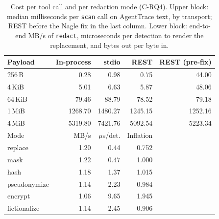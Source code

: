 \begin{table}[t]
\caption{Cost per tool call and per redaction mode (C-RQ4). Upper block: median milliseconds per \texttt{scan} call on AgentTrace text, by transport; REST before the Nagle fix in the last column. Lower block: end-to-end MB/s of \texttt{redact}, microseconds per detection to render the replacement, and bytes out per byte in.}\label{tab:cost}
\centering\footnotesize\setlength{\tabcolsep}{4pt}
\begin{tabular}{@{}l r r r r@{}}
\toprule
Payload & In-process & stdio & REST & REST (pre-fix) \\
\midrule
256\,B & 0.28 & 0.98 & 0.75 & 44.00 \\
4\,KiB & 5.01 & 6.63 & 5.87 & 48.06 \\
64\,KiB & 79.46 & 88.79 & 78.52 & 79.18 \\
1\,MiB & 1268.70 & 1480.27 & 1245.15 & 1252.16 \\
4\,MiB & 5319.80 & 7421.76 & 5092.54 & 5223.34 \\
\midrule
Mode & MB/s & $\mu$s/det. & Inflation & \\
\midrule
replace & 1.20 & 0.44 & 0.752 & \\
mask & 1.22 & 0.47 & 1.000 & \\
hash & 1.18 & 1.37 & 1.015 & \\
pseudonymize & 1.14 & 2.23 & 0.984 & \\
encrypt & 1.06 & 9.65 & 1.945 & \\
fictionalize & 1.14 & 2.45 & 0.906 & \\
\bottomrule
\end{tabular}
\end{table}
